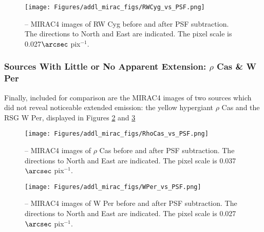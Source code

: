 \begin{figure}[htp]
\centering
\texttt{[image: Figures/addl\_mirac\_figs/RWCyg\_vs\_PSF.png]}	
\caption[MIRAC4 images of RW Cyg.]{-- MIRAC4 images of RW Cyg  before and after PSF subtraction.  The directions to North and East are indicated.  The pixel scale is 0.027$\arcsec$ pix$^{-1}$.} 
\label{fig:RWCyg_MIRAC4}
\end{figure} 



\subsubsection{Sources With Little or No Apparent Extension:  $\rho$ Cas \& W Per}
Finally, included for comparison are the MIRAC4 images of two sources which did not reveal noticeable extended emission: the yellow hypergiant $\rho$ Cas and the RSG W Per, displayed in Figures \ref{fig:rhoCas_MIRAC4} and \ref{fig:WPer_MIRAC4}

\begin{figure}[htp]
\centering
\texttt{[image: Figures/addl\_mirac\_figs/RhoCas\_vs\_PSF.png]}	
\caption[MIRAC4 images of $\rho$ Cas.]{-- MIRAC4 images of $\rho$ Cas before and after PSF subtraction.  The directions to North and East are indicated.  The pixel scale is 0.037$\arcsec$ pix$^{-1}$.} 
\label{fig:rhoCas_MIRAC4}
\end{figure} 

\begin{figure}[htp]
\centering
\texttt{[image: Figures/addl\_mirac\_figs/WPer\_vs\_PSF.png]}	
\caption[MIRAC4 images of W Per.]{-- MIRAC4 images of W Per  before and after PSF subtraction.  The directions to North and East are indicated.  The pixel scale is 0.027$\arcsec$ pix$^{-1}$.} 
\label{fig:WPer_MIRAC4}
\end{figure} 





